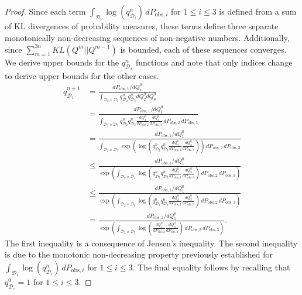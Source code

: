 \documentclass{article}
\begin{document}
\begin{proof}
Since each term $\int_{\mathcal{D}_{i}}\log(q_{\mathcal{D}_{i}}^{n})\, dP_{\text{obs},i}$ for $1\leq i\leq 3$ is defined from a sum of KL divergences of probability measures, these terms define three separate monotonically non-decreasing sequences of non-negative numbers.
Additionally, since $\sum_{m=1}^{3n} KL(Q^m || Q^{m-1})$ is bounded, each of these sequences converges. 
We derive upper bounds for the $q_{\mathcal{D}_1}^n$ functions and note that only indices change to derive upper bounds for the other cases. 
\begin{align*}
    q^{n+1}_{\mathcal{D}_{1}} &= \frac{dP_{\text{obs},1}/dQ_{1}^{0}}{\int_{\mathcal{D}_{2} \times \mathcal{D}_{3}}q^{n}_{\mathcal{D}_{2}}q^{n}_{\mathcal{D}_{3}} dQ^{0}_{2}dQ^{0}_{3}}\\
        &= \frac{dP_{\text{obs},1}/dQ_{1}^{0}}{\int_{\mathcal{D}_{2} \times \mathcal{D}_{3}}q^{n}_{\mathcal{D}_{2}}q^{n}_{\mathcal{D}_{3}}\frac{dQ^{0}_{2}}{dP_{\text{obs},2}}\frac{dQ^{0}_{3}}{dP_{\text{obs},3}} \, dP_{\text{obs},2}\, dP_{\text{obs},3}}\\
        &= \frac{dP_{\text{obs},1}/dQ_{1}^{0}}{\int_{\mathcal{D}_{2} \times \mathcal{D}_{3}}\exp(\log(q^{n}_{\mathcal{D}_{2}}q^{n}_{\mathcal{D}_{3}}\frac{dQ^{0}_{2}}{dP_{\text{obs},2}}\frac{dQ^{0}_{3}}{dP_{\text{obs},3}} ))\, dP_{\text{obs},2}\, dP_{\text{obs},3}}\\
        &\le\frac{dP_{\text{obs},1}/dQ_{1}^{0}}{\exp(\int_{\mathcal{D}_{2} \times \mathcal{D}_{3}}\log(q^{n}_{\mathcal{D}_{2}}q^{n}_{\mathcal{D}_{3}}\frac{dQ^{0}_{2}}{dP_{\text{obs},2}}\frac{dQ^{0}_{3}}{dP_{\text{obs},3}} )\, dP_{\text{obs},2}\, dP_{\text{obs},3})}\\
        &\le \frac{dP_{\text{obs},1}/dQ_{1}^{0}}{\exp(\int_{\mathcal{D}_{2} \times \mathcal{D}_{3}}\log(q^{0}_{\mathcal{D}_{2}}q^{0}_{\mathcal{D}_{3}}\frac{dQ^{0}_{2}}{dP_{\text{obs},2}}\frac{dQ^{0}_{3}}{dP_{\text{obs},3}} )\, dP_{\text{obs},2}\, dP_{\text{obs},3})}\\
        &= \frac{dP_{\text{obs},1}/dQ_{1}^{0}}{\exp(\int_{\mathcal{D}_{2} \times \mathcal{D}_{3}}\log(\frac{dQ^{0}_{2}}{dP_{\text{obs},2}}\frac{dQ^{0}_{3}}{dP_{\text{obs},3}} )\, dP_{\text{obs},2}\, dP_{\text{obs},3})}.
\end{align*}
The first inequality is a consequence of Jensen's inequality.
The second inequality is due to the monotonic non-decreasing property previously established for $\int_{\mathcal{D}_{i}}\log(q_{\mathcal{D}_{i}}^{n})\, dP_{\text{obs},i}$ for $1\leq i\leq 3$.
The final equality follows by recalling that $q_{\mathcal{D}_i}^0=1$ for $1\leq i\leq 3$. 

\end{proof}
\end{document}
